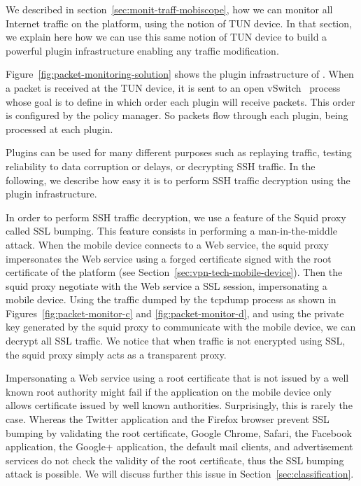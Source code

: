 We described in section~\ref{sec:monit-traff-mobiscope}, how we can
monitor all Internet traffic on the \platname{} platform, using the
notion of TUN device. In that section, we explain here how we can use
this same notion of TUN device to build a powerful plugin
infrastructure enabling any traffic modification.

Figure~\ref{fig:packet-monitoring-solution} shows the plugin
infrastructure of \platname. When a packet is received at the TUN
device, it is sent to an open vSwitch~\cite{Openvswitch} process whose
goal is to define in which order each plugin will receive
packets. This order is configured by the policy manager. So packets
flow through each plugin, being processed at each plugin. 

Plugins can be used for many different purposes such as replaying
traffic, testing reliability to data corruption or delays, or
decrypting SSH traffic. In the following, we describe how easy it is
to perform SSH traffic decryption using the \platname{} plugin
infrastructure.

In order to perform SSH traffic decryption, we use a 
feature of the Squid proxy called SSL bumping. This feature consists in performing a man-in-the-middle
attack. When the mobile device connects to a Web service, the squid
proxy impersonates the Web service using a forged certificate signed
with the root certificate of the \platname{} platform (see
Section~\ref{sec:vpn-tech-mobile-device}). Then the squid proxy
negotiate with the Web service a SSL session, impersonating a mobile
device. Using the traffic dumped by the tcpdump process as shown in
Figures~\ref{fig:packet-monitor-c} and \ref{fig:packet-monitor-d}, and
using the private key generated by the squid proxy to communicate with
the mobile device, we can decrypt all SSL traffic. We notice that when
traffic is not encrypted using SSL, the squid proxy simply acts as a
transparent proxy. 

Impersonating a Web service using a root certificate that is not
issued by a well known root authority might fail if the application on
the mobile device only allows certificate issued by well known
authorities. Surprisingly, this is rarely the case. Whereas the
Twitter application and the Firefox browser prevent SSL bumping by
validating the root certificate, Google Chrome, Safari, the Facebook
application, the Google+ application, the default mail clients, and
advertisement services do not check the validity of the root
certificate, thus the SSL bumping attack is possible. We will discuss
further this issue in Section~\ref{sec:classification}. 

